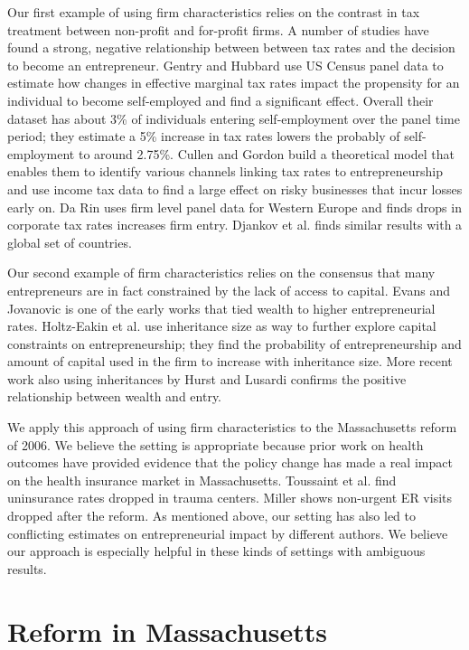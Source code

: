 Our first example of using firm characteristics relies on the contrast in tax treatment between non-profit and for-profit firms. A number of studies have found a strong, negative relationship between between tax rates and the decision to become an entrepreneur. Gentry and Hubbard \cite{gentry} use US Census panel data to estimate how changes in effective marginal tax rates impact the propensity for an individual to become self-employed and find a significant effect. Overall their dataset has about 3\% of individuals entering self-employment over the panel time period; they estimate a 5\% increase in tax rates lowers the probably of self-employment to around 2.75\%. Cullen and Gordon \cite{cullen} build a theoretical model that enables them to identify various channels linking tax rates to entrepreneurship and use income tax data to find a large effect on risky businesses that incur losses early on. Da Rin \cite{darin} uses firm level panel data for Western Europe and finds drops in corporate tax rates increases firm entry. Djankov et al. \cite{djankov} finds similar results with a global set of countries. 

Our second example of firm characteristics relies on the consensus that many entrepreneurs are in fact constrained by the lack of access to capital. Evans and Jovanovic \cite{evans} is one of the early works that tied wealth to higher entrepreneurial rates. Holtz-Eakin et al. \cite{holtz_capital} use inheritance size as way to further explore capital constraints on entrepreneurship; they find the probability of entrepreneurship and amount of capital used in the firm to increase with inheritance size. More recent work also using inheritances by Hurst and Lusardi \cite{hurst} confirms the positive relationship between wealth and entry. 

We apply this approach of using firm characteristics to the Massachusetts reform of 2006. We believe the setting is appropriate because prior work on health outcomes have provided evidence that the policy change has made a real impact on the health insurance market in Massachusetts. Toussaint et al. \cite{toussaint} find uninsurance rates dropped in trauma centers. Miller \cite{miller_er} shows non-urgent ER visits dropped after the reform. As mentioned above, our setting has also led to conflicting estimates on entrepreneurial impact by different authors. We believe our approach is especially helpful in these kinds of settings with ambiguous results. 

\chapter{Reform in Massachusetts}
\label{sec:reform}


